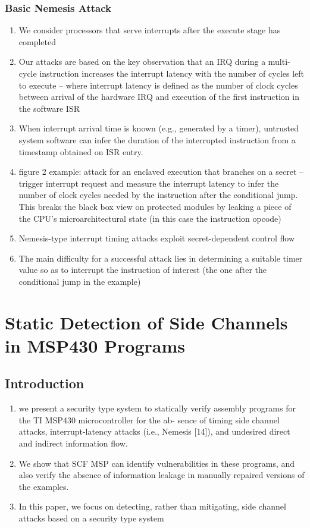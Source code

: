 \documentclass{article}
\begin{document}
\subsubsection{Basic Nemesis Attack}
\begin{enumerate}
\item We consider processors that serve interrupts after the execute stage has completed
\item Our attacks are based on the key observation that an IRQ during a multi-cycle instruction increases the interrupt latency with the number of cycles
left to execute – where interrupt latency is defined as the number of clock cycles between arrival of the hardware IRQ and execution of the first instruction in the software ISR
\item When interrupt arrival time is known (e.g., generated by a timer), untrusted system software can
infer the duration of the interrupted instruction from a timestamp obtained on ISR entry.
\item figure 2 example: attack for an enclaved execution that branches on a secret -- trigger interrupt request and measure the interrupt latency to infer the number of clock cycles needed by the instruction after the conditional jump. This breaks the black box view on protected modules by leaking a piece of the CPU's microarchitectural state (in this case the instruction opcode)
\item Nemesis-type interrupt timing attacks exploit secret-dependent control flow
\item The main difficulty
for a successful attack lies in determining a suitable timer value
so as to interrupt the instruction of interest (the one after the conditional jump in the example)
\end{enumerate}

\section{Static Detection of Side Channels in MSP430 Programs}
\subsection{Introduction}
\begin{enumerate}
\item we present a security type system to statically verify
assembly programs for the TI MSP430 microcontroller for the ab-
sence of timing side channel attacks, interrupt-latency attacks (i.e.,
Nemesis [14]), and undesired direct and indirect information flow.
\item We show that SCF MSP can identify
vulnerabilities in these programs, and also verify the absence of
information leakage in manually repaired versions of the examples.
\item In this paper, we focus on detecting, rather than mitigating, side
channel attacks based on a security type system
\end{enumerate}
\end{document}
